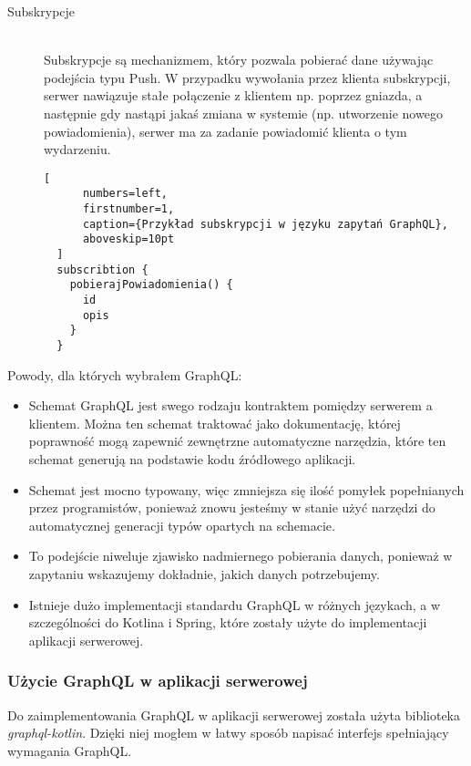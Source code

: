 \begin{description}
\vspace{0.4cm}

\item[Subskrypcje] \hfill \\ Subskrypcje są mechanizmem, który pozwala pobierać dane używając podejścia typu Push. W przypadku wywołania przez klienta subskrypcji, serwer nawiązuje stałe połączenie z klientem np. poprzez gniazda, a następnie gdy nastąpi jakaś zmiana w systemie (np. utworzenie nowego powiadomienia), serwer ma za zadanie powiadomić klienta o tym wydarzeniu.
  \begin{addmargin}[6mm]{0mm}
  \begin{lstlisting}[
      numbers=left,
      firstnumber=1,
      caption={Przykład subskrypcji w języku zapytań GraphQL},
      aboveskip=10pt
  ]
  subscribtion {
    pobierajPowiadomienia() {
      id
      opis
    }
  }
  \end{lstlisting}
  \end{addmargin}
\end{description}
Powody, dla których wybrałem GraphQL:
\begin{itemize}
  \item Schemat GraphQL jest swego rodzaju kontraktem pomiędzy serwerem a klientem. Można ten schemat traktować jako dokumentację, której poprawność mogą zapewnić zewnętrzne automatyczne narzędzia, które ten schemat generują na podstawie kodu źródłowego aplikacji.
  \item Schemat jest mocno typowany, więc zmniejsza się ilość pomyłek popełnianych przez programistów, ponieważ znowu jesteśmy w stanie użyć narzędzi do automatycznej generacji typów opartych na schemacie.
  \item To podejście niweluje zjawisko nadmiernego pobierania danych, ponieważ w zapytaniu wskazujemy dokładnie, jakich danych potrzebujemy.
  \item Istnieje dużo implementacji standardu GraphQL w różnych językach, a w szczególności do Kotlina i Spring, które zostały użyte do implementacji aplikacji serwerowej.
\end{itemize}

\subsubsection{Użycie GraphQL w aplikacji serwerowej}
Do zaimplementowania GraphQL w aplikacji serwerowej została użyta biblioteka \emph{graphql-kotlin}. Dzięki niej mogłem w łatwy sposób napisać interfejs spełniający wymagania GraphQL.

